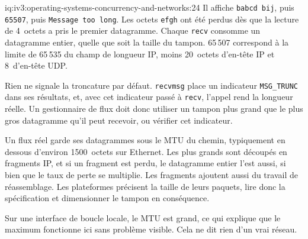 \begin{solution}{iq:iv3:operating-systems-concurrency-and-networks:24}
Il affiche \texttt{b\textquotesingle{}abcd\textquotesingle{} b\textquotesingle{}ij\textquotesingle{}}, puis \texttt{65507}, puis \texttt{Message too long}. Les octets \texttt{efgh} ont été perdus dès que la lecture de 4~octets a pris le premier datagramme. Chaque \texttt{recv} consomme un datagramme entier, quelle que soit la taille du tampon. 65\,507 correspond à la limite de 65\,535 du champ de longueur IP, moins 20~octets d'en-tête IP et 8~d'en-tête UDP.

Rien ne signale la troncature par défaut. \texttt{recvmsg} place un indicateur \texttt{MSG\_TRUNC} dans ses résultats, et, avec cet indicateur passé à \texttt{recv}, l'appel rend la longueur réelle. Un gestionnaire de flux doit donc utiliser un tampon plus grand que le plus gros datagramme qu'il peut recevoir, ou vérifier cet indicateur.

Un flux réel garde ses datagrammes sous le MTU du chemin, typiquement en dessous d'environ 1500~octets sur Ethernet. Les plus grands sont découpés en fragments IP, et si un fragment est perdu, le datagramme entier l'est aussi, si bien que le taux de perte se multiplie. Les fragments ajoutent aussi du travail de réassemblage. Les plateformes précisent la taille de leurs paquets, lire donc la spécification et dimensionner le tampon en conséquence.

Sur une interface de boucle locale, le MTU est grand, ce qui explique que le maximum fonctionne ici sans problème visible. Cela ne dit rien d'un vrai réseau.

\end{solution}


